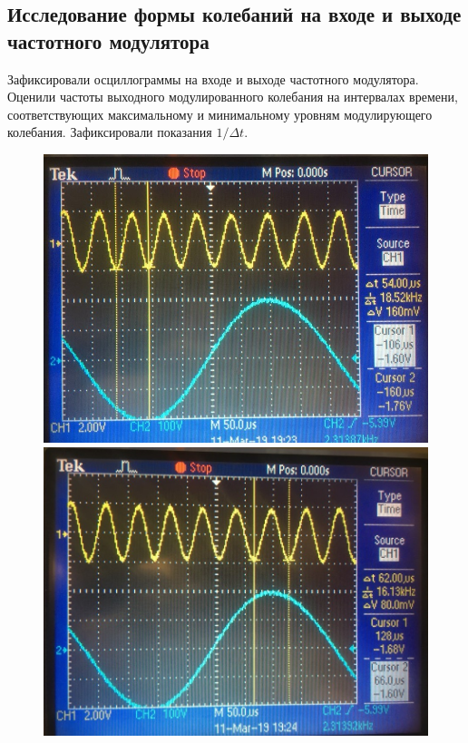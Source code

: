 \subsection{Исследование формы колебаний на входе и выходе частотного модулятора}
Зафиксировали осциллограммы на входе и выходе частотного модулятора. Оценили частоты выходного модулированного колебания на интервалах времени, соответствующих максимальному и минимальному уровням модулирующего колебания. Зафиксировали показания $1 / \Delta t$.
\begin{figure}[!h]
	\centering
	\begin{minipage}{0.49\linewidth}
	\includegraphics[width=\linewidth]{photo/task4(1).jpg}
	\end{minipage}
	\begin{minipage}{0.49\linewidth}
	\includegraphics[width=\linewidth]{photo/task4(2).jpg}
	\end{minipage}
	\caption{}
	\label{fig:figure2}
\end{figure}
